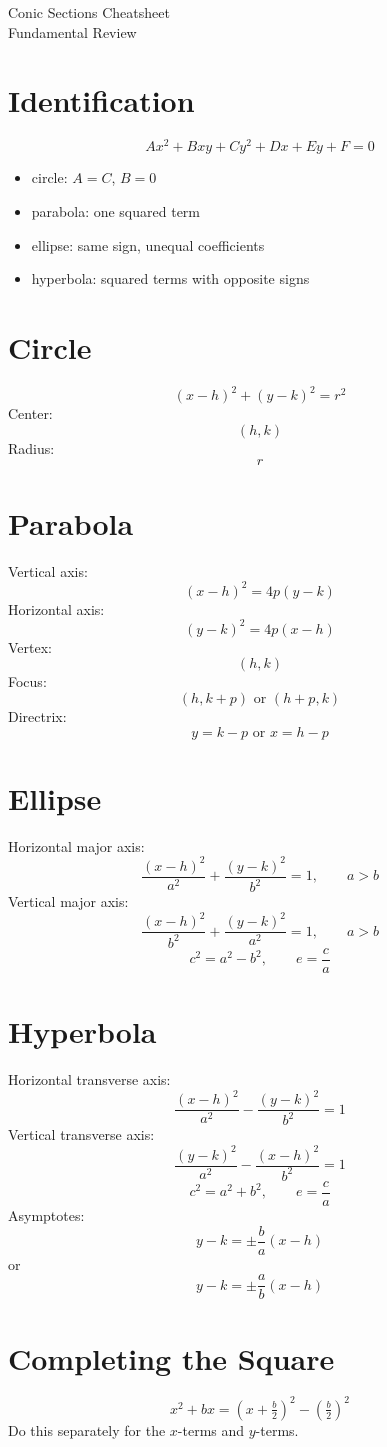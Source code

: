 \documentclass[11pt]{article}
\begin{document}
\begin{center}
{\LARGE Conic Sections Cheatsheet}\\[0.4em]
{\large Fundamental Review}
\end{center}

\section*{Identification}
\[
Ax^2+Bxy+Cy^2+Dx+Ey+F=0
\]
\begin{itemize}
  \item circle: $A=C$, $B=0$
  \item parabola: one squared term
  \item ellipse: same sign, unequal coefficients
  \item hyperbola: squared terms with opposite signs
\end{itemize}

\section*{Circle}
\[
(x-h)^2+(y-k)^2=r^2
\]
Center:
\[
(h,k)
\]
Radius:
\[
r
\]

\section*{Parabola}
Vertical axis:
\[
(x-h)^2=4p(y-k)
\]
Horizontal axis:
\[
(y-k)^2=4p(x-h)
\]
Vertex:
\[
(h,k)
\]
Focus:
\[
(h,k+p)\text{ or }(h+p,k)
\]
Directrix:
\[
y=k-p \text{ or } x=h-p
\]

\section*{Ellipse}
Horizontal major axis:
\[
\frac{(x-h)^2}{a^2}+\frac{(y-k)^2}{b^2}=1,\qquad a>b
\]
Vertical major axis:
\[
\frac{(x-h)^2}{b^2}+\frac{(y-k)^2}{a^2}=1,\qquad a>b
\]
\[
c^2=a^2-b^2,\qquad e=\frac{c}{a}
\]

\section*{Hyperbola}
Horizontal transverse axis:
\[
\frac{(x-h)^2}{a^2}-\frac{(y-k)^2}{b^2}=1
\]
Vertical transverse axis:
\[
\frac{(y-k)^2}{a^2}-\frac{(x-h)^2}{b^2}=1
\]
\[
c^2=a^2+b^2,\qquad e=\frac{c}{a}
\]
Asymptotes:
\[
y-k=\pm \frac{b}{a}(x-h)
\]
or
\[
y-k=\pm \frac{a}{b}(x-h)
\]

\section*{Completing the Square}
\[
x^2+bx=(x+\tfrac{b}{2})^2-\left(\tfrac{b}{2}\right)^2
\]
Do this separately for the $x$-terms and $y$-terms.
\end{document}
